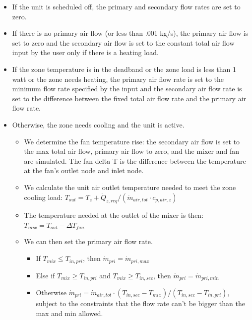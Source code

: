 \begin{itemize}
  \item
    If the unit is scheduled off, the primary and secondary flow rates are set to zero.
  \item
    If there is no primary air flow (or less than .001 kg/s), the primary air flow is set to zero and the secondary air flow is set to the constant total air flow input by the user only if there is a heating load.
  \item
    If the zone temperature is in the deadband or the zone load is less than 1 watt or the zone needs heating, the primary air flow rate is set to the minimum flow rate specified by the input and the secondary air flow rate is set to the difference between the fixed total air flow rate and the primary air flow rate.
  \item
    Otherwise, the zone needs cooling and the unit is active.
    \begin{itemize}
      \item
        We determine the fan temperature rise: the secondary air flow is set to the max total air flow, primary air flow to zero, and the mixer and fan are simulated. The fan delta T is the difference between the temperature at the fan's outlet node and inlet node.
      \item
        We calculate the unit air outlet temperature needed to meet the zone cooling load: \({T_{out}} = {T_{z}} + {\dot Q_{z,req}}/({\dot m_{air,tot}}\cdot {c_{p,air,z}})\)
      \item
        The temperature needed at the outlet of the mixer is then: \({T_{mix}} = {T_{out}} - \Delta {T_{fan}}\)
      \item
        We can then set the primary air flow rate.
        \begin{itemize}
          \item
            If \({T_{mix}} \le {T_{in,pri}}\), then \({\dot m_{pri}} = {\dot m_{pri,max}}\)
          \item
            Else if \({T_{mix}} \ge {T_{in,pri}}\) and \({T_{mix}} \ge {T_{in,sec}}\), then \({\dot m_{pri}} = {\dot m_{pri,min}}\)
          \item
            Otherwise \({\dot m_{pri}} = {\dot m_{air,tot}}\cdot ({T_{in,sec}} - {T_{mix}})/({T_{in,sec}} - {T_{in,pri}})\), subject to the constraints that the flow rate can't be bigger than the max and min allowed.
        \end{itemize}
    \end{itemize}
\end{itemize}

